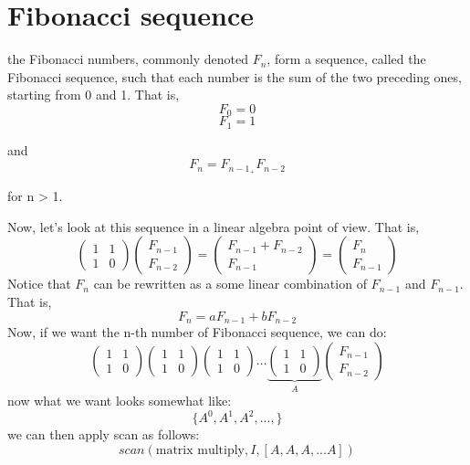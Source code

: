 \documentclass[12pt]{article}
\begin{document}
\section{Fibonacci sequence }
\begin{definition}
the Fibonacci numbers, commonly denoted $F_n$, form a sequence, called the Fibonacci sequence, such that each number is the sum of the two preceding ones, starting from 0 and 1. That is,
$$F_0 = 0$$
$$F_1= 1$$

and 
$$F_n = F_{n-1} _+ F_{n-2}$$

for n > 1.
\end{definition}{}
Now, let's look at this sequence in a linear algebra point of view. That is,\\
$$
\begin{pmatrix}
1 &1 \\
1 &0
\end{pmatrix}
\begin{pmatrix}
F_{n-1} \\
F_{n-2}
\end{pmatrix}
=
\begin{pmatrix}
F_{n-1} + F_{n-2}\\
F_{n-1}
\end{pmatrix}
=\begin{pmatrix}
F_n\\
F_{n-1}
\end{pmatrix}
$$
Notice that $F_n$ can be rewritten as a some linear combination of $F_{n-1}$ and $F_{n-1}$. That is,
$$F_n = aF_{n-1} + bF_{n-2}$$
Now, if we want the n-th number of Fibonacci sequence, we can do:
$$
\begin{pmatrix}
1 &1 \\
1 &0
\end{pmatrix}
\begin{pmatrix}
1 &1 \\
1 &0
\end{pmatrix}
\begin{pmatrix}
1 &1 \\
1 &0
\end{pmatrix}
...
\underbrace{
\begin{pmatrix}
1 &1 \\
1 &0
\end{pmatrix}
}_{A}
\begin{pmatrix}
F_{n-1} \\
F_{n-2}
\end{pmatrix}
$$
now what we want looks somewhat like:
$$\{A^0, A^1,A^2, ... , \}$$
we can then apply scan as follows:
$$scan(\text{matrix multiply}, I, [A,A,A,...A]) $$
\end{document}
